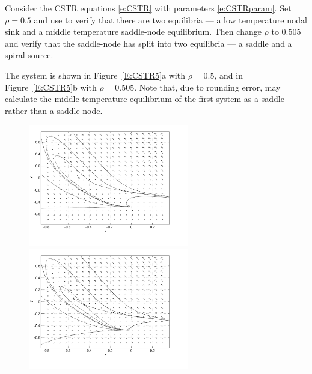 \documentclass{ximera}
\begin{document}
\begin{computerExercise}  \label{E:CSTR5}
Consider the CSTR equations \eqref{e:CSTR} with parameters 
\eqref{e:CSTRparam}. Set $\rho=0.5$ and use 
{\pplane} to verify 
that there are two equilibria --- a low temperature nodal sink 
and a middle temperature saddle-node equilibrium.  Then change 
$\rho$ to $0.505$ and verify that the saddle-node has split 
into two equilibria --- a saddle and a spiral source.

\begin{solution}

The system is shown in Figure~\ref{E:CSTR5}a with $\rho = 0.5$, and in
Figure~\ref{E:CSTR5}b with $\rho = 0.505$.  Note that, due to rounding
error, {\pplane} may calculate the middle temperature equilibrium of
the first system as a saddle rather than a saddle node.  

\begin{figure}[htb]
                       \centerline{%
                       \includegraphics[width=2.75in]{exfigure/CSTR5a.pdf}
                       \includegraphics[width=2.75in]{exfigure/CSTR5b.pdf}}
\end{figure}

\end{solution}
\end{computerExercise}
\end{document}
